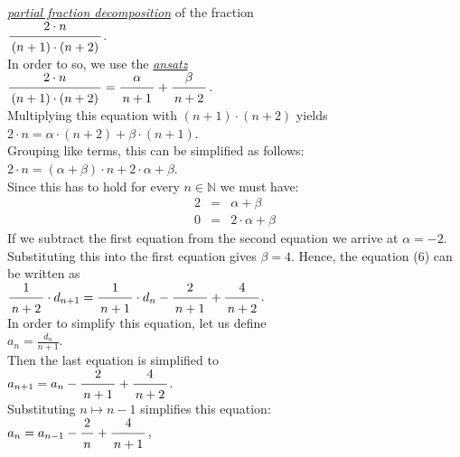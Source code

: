 \href{http://en.wikipedia.org/wiki/Partial_fraction}{\emph{partial fraction decomposition}}
of the fraction
\\[0.2cm]
\hspace*{1.3cm}
$\bruch{2\cdot n}{(n+1)\cdot(n+2)}$.
\\[0.2cm] 
In order to so, we use the \href{http://en.wikipedia.org/wiki/Ansatz}{\emph{ansatz}}
\\[0.2cm]
\hspace*{1.3cm}
$\bruch{2\cdot n}{(n+1)\cdot(n+2)} = \bruch{\alpha}{n+1} + \bruch{\beta}{n+2}$.
\\[0.2cm] 
Multiplying this equation with $(n+1) \cdot (n+2)$ yields
\\[0.2cm]
\hspace*{1.3cm}
$ 2\cdot n = \alpha \cdot (n+2) + \beta \cdot (n+1)$.
\\[0.2cm]
Grouping like terms, this can be simplified as follows:
\\[0.2cm]
\hspace*{1.3cm}
$2\cdot n = (\alpha + \beta) \cdot n + 2 \cdot \alpha  + \beta$.
\\[0.2cm]
Since this has to hold for every $n \in \mathbb{N}$ we must have:
\begin{eqnarray*}
  2 & = & \alpha + \beta \\
  0 & = & 2 \cdot \alpha + \beta 
\end{eqnarray*}
If we subtract the first equation from the second equation we arrive at
 $\alpha = -2$.  Substituting this into the first equation gives $\beta = 4$.
Hence, the equation (6) can be written as
\\[0.2cm]
\hspace*{1.3cm}
$\bruch{1}{n+2} \cdot d_{n+1} = \bruch{1}{n+1}\cdot d_{n} - \bruch{2}{n+1} + \bruch{4}{n+2}$.  
\\[0.2cm]  
In order to simplify this equation, let us define
\\[0.2cm]
\hspace*{1.3cm}
 $\displaystyle a_n = \frac{d_n}{n+1}$. 
\\[0.2cm] 
Then the last equation is simplified to
\\[0.2cm]
\hspace*{1.3cm}
$a_{n+1} = a_{n} - \bruch{2}{n+1} + \bruch{4}{n+2}$.
\\[0.2cm] 
Substituting $n \mapsto n-1$ simplifies this equation: 
\\[0.2cm]
\hspace*{1.3cm}
$a_{n} = a_{n-1} - \bruch{2}{n} + \bruch{4}{n+1}$,

